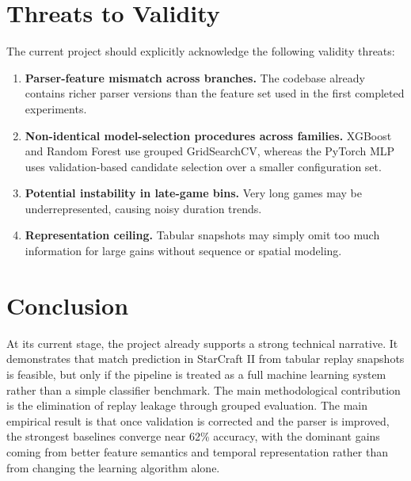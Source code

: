 \documentclass[11pt,a4paper]{article}
\begin{document}
\section{Threats to Validity}
The current project should explicitly acknowledge the following validity threats:
\begin{enumerate}
    \item \textbf{Parser-feature mismatch across branches.} The codebase already contains richer parser versions than the feature set used in the first completed experiments.
    \item \textbf{Non-identical model-selection procedures across families.} XGBoost and Random Forest use grouped GridSearchCV, whereas the PyTorch MLP uses validation-based candidate selection over a smaller configuration set.
    \item \textbf{Potential instability in late-game bins.} Very long games may be underrepresented, causing noisy duration trends.
    \item \textbf{Representation ceiling.} Tabular snapshots may simply omit too much information for large gains without sequence or spatial modeling.
\end{enumerate}

\section{Conclusion}
At its current stage, the project already supports a strong technical narrative. It demonstrates that match prediction in StarCraft II from tabular replay snapshots is feasible, but only if the pipeline is treated as a full machine learning system rather than a simple classifier benchmark. The main methodological contribution is the elimination of replay leakage through grouped evaluation. The main empirical result is that once validation is corrected and the parser is improved, the strongest baselines converge near 62\% accuracy, with the dominant gains coming from better feature semantics and temporal representation rather than from changing the learning algorithm alone.
\end{document}
